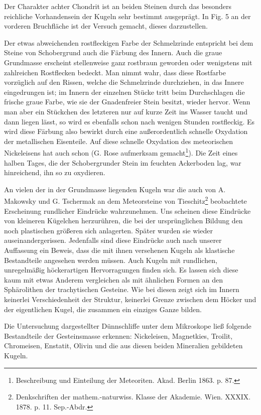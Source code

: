 \documentclass[a4paper, 11pt, oneside]{article}
\begin{document}
Der Charakter achter Chondrit ist an beiden Steinen durch das besonders reichliche Vorhandensein der Kugeln sehr bestimmt ausgeprägt. In Fig. 5 an der vorderen Bruchfläche ist der Versuch gemacht, dieses darzustellen.

Der etwas abweichenden rostfleckigen Farbe der Schmelzrinde entspricht bei dem Steine von Schobergrund auch die Färbung des Innern. Auch die graue Grundmasse erscheint stellenweise ganz rostbraun geworden oder wenigstens mit zahlreichen Rostflecken bedeckt. Man nimmt wahr, dass diese Rostfarbe vorzüglich auf den Rissen, welche die Schmelzrinde durchziehen, in das Innere eingedrungen ist; im Innern der einzelnen Stücke tritt beim Durchschlagen die frische graue Farbe, wie sie der Gnadenfreier Stein besitzt, wieder hervor. Wenn man aber ein Stückchen des letzteren nur auf kurze Zeit ins Wasser taucht und dann liegen lässt, so wird es ebenfalls schon nach wenigen Stunden rostfleckig. Es wird diese Färbung also bewirkt durch eine außerordentlich schnelle Oxydation der metallischen Eisenteile. Auf diese schnelle Oxydation des meteorischen Nickeleisens hat auch schon (G. Rose aufmerksam gemacht\footnote{Beschreibung und Einteilung der Meteoriten. Akad. Berlin 1863. p. 87.}). Die Zeit eines halben Tages, die der Schobergrunder Stein im feuchten Ackerboden lag, war hinreichend, ihn so zu oxydieren.

An vielen der in der Grundmasse liegenden Kugeln war die auch von A. Makowsky und G. Tschermak an dem Meteorsteine von Tieschitz\footnote{Denkschriften der mathem.-naturwiss. Klasse der Akademie. Wien. XXXIX. 1878. p. 11. Sep.-Abdr.} beobachtete Erscheinung rundlicher Eindrücke wahrzunehmen. Uns scheinen diese Eindrücke von kleineren Kügelchen herzurühren, die bei der ursprünglichen Bildung den noch plastischen größeren sich anlagerten. Später wurden sie wieder auseinandergerissen. Jedenfalls sind diese Eindrücke auch nach unserer Auffassung ein Beweis, dass die mit ihnen versehenen Kugeln als klastische Bestandteile angesehen werden müssen. Auch Kugeln mit rundlichen, unregelmäßig höckerartigen Hervorragungen finden sich. Es lassen sich diese kaum mit etwas Anderem vergleichen als mit ähnlichen Formen an den Sphärolithen der trachytischen Gesteine. Wie bei diesen zeigt sich im Innern keinerlei Verschiedenheit der Struktur, keinerlei Grenze zwischen dem Höcker und der eigentlichen Kugel, die zusammen ein einziges Ganze bilden.

Die Untersuchung dargestellter Dünnschliffe unter dem Mikroskope ließ folgende Bestandteile der Gesteinsmasse erkennen: Nickeleisen, Magnetkies, Troilit, Chromeisen, Enstatit, Olivin und die aus diesen beiden Mineralien gebildeten Kugeln.
\end{document}
